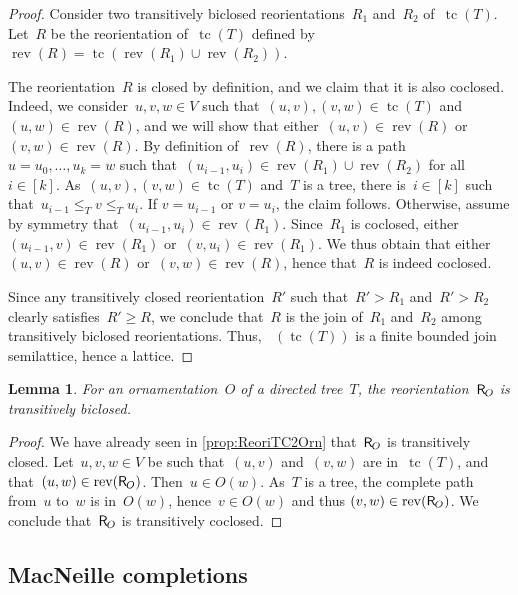\documentclass{amsart}
\newtheorem{lemma}[theorem]{Lemma}
\theoremstyle{definition}
\renewcommand{\c}[1]{\mathcal{#1}} %
\DeclareMathOperator{\tc}{tc} %
\newcommand{\mymap}[2]{\mathsf{#1}_{\hspace{-.7pt}#2}}
\newcommand{\reori}[1]{\mymap{R}{#1}}  %
\DeclareMathOperator{\Rbi}{\c{R}^{bi}}  %
\DeclareMathOperator{\rev}{rev} %
\begin{document}
\begin{proof}
Consider two transitively biclosed reorientations~$R_1$ and~$R_2$ of~$\tc(T)$.
Let~$R$ be the reorientation of~$\tc(T)$ defined by~$\rev(R) = \tc(\rev(R_1) \cup \rev(R_2))$.

The reorientation~$R$ is closed by definition, and we claim that it is also coclosed.
Indeed, we consider~$u,v,w \in V$ such that~$(u,v), (v,w) \in \tc(T)$ and~$(u,w) \in \rev(R)$, and we will show that either~$(u,v) \in \rev(R)$ or~$(v,w) \in \rev(R)$.
By definition of~$\rev(R)$, there is a path~${u = u_0, \dots, u_k = w}$ such that~$(u_{i-1}, u_i) \in \rev(R_1) \cup \rev(R_2)$ for all~$i \in [k]$.
As~$(u,v), (v,w) \in \tc(T)$ and~$T$ is a tree, there is~$i \in [k]$ such that~$u_{i-1} \le_T v \le_T u_i$.
If $v = u_{i-1}$ or $v = u_i$, the claim follows. 
Otherwise, assume by symmetry that~$(u_{i-1}, u_i) \in \rev(R_1)$.
Since~$R_1$ is coclosed, either~$(u_{i-1}, v) \in \rev(R_1)$ or~$(v, u_i) \in \rev(R_1)$.
We thus obtain that either~$(u,v) \in \rev(R)$ or~$(v,w) \in \rev(R)$, hence that~$R$ is indeed coclosed.

Since any transitively closed reorientation~$R'$ such that~$R' > R_1$ and~$R' > R_2$ clearly satisfies~$R' \ge R$, we conclude that~$R$ is the join of~$R_1$ and~$R_2$ among transitively biclosed reorientations.
Thus, $\Rbi(\tc(T))$ is a finite bounded join semilattice, hence a lattice.
\end{proof}

\begin{lemma}
\label{lem:Orn2ReoriT}
For an ornamentation~$O$ of a directed tree~$T$, the reorientation~$\reori{O}$ is transitively biclosed.
\end{lemma}

\begin{proof}
We have already seen in \cref{prop:ReoriTC2Orn} that~$\reori{O}$ is transitively closed.
Let~$u, v, w \in V$ be such that~$(u,v)$ and~$(v,w)$ are in~$\tc(T)$,
and that~$(u,w) \in \rev(\reori{O})$. Then~$u \in O(w)$. As~$T$ is a tree, the complete path from~$u$ to~$w$ is in~$O(w)$, hence~$v \in O(w)$ and thus $(v,w) \in \rev(\reori{O})$.
We conclude that~$\reori{O}$ is transitively coclosed.
\end{proof}


\subsection{MacNeille completions}
\label{subsec:MacNeilleT}
\end{document}
